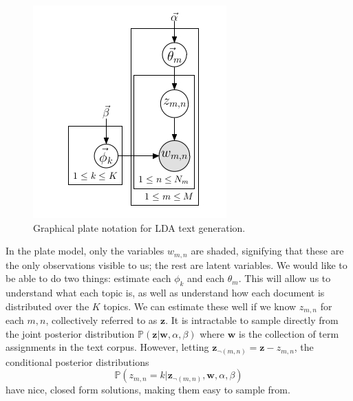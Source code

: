 \begin{figure}[h]
\centering
\includegraphics[width=\textwidth]{graphicalplate.jpg}
\caption{Graphical plate notation for LDA text generation.}
\label{fig:ldaplates}
\end{figure}

In the plate model, only the variables $w_{m,n}$ are shaded, signifying that these are the only observations visible to us; the rest are latent variables. We would like to be able to do two things: estimate each $\phi_{k}$ and each $\theta_{m}$. This will allow us to understand what each topic is, as well as understand how each document is distributed over the $K$ topics. We can estimate these well if we know $z_{m,n}$ for each $m, n$, collectively referred to as $\mathbf{z}$. It is intractable to sample directly from the joint posterior distribution $\mathbb{P}(\mathbf{z} | \mathbf{w}, \alpha, \beta)$ where $\mathbf{w}$ is the collection of term assignments in the text corpus. However, letting $\mathbf{z}_{\neg (m,n)} = \mathbf{z} - z_{m,n}$, the conditional posterior distributions $$\mathbb{P}(z_{m,n} = k | \mathbf{z}_{\neg (m,n)}, \mathbf{w}, \alpha, \beta)$$ have nice, closed form solutions, making them easy to sample from.

